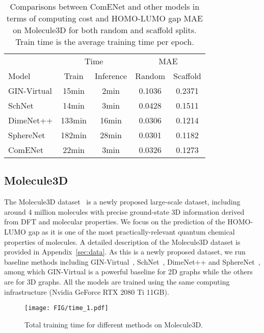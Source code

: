 \documentclass{article}
\begin{document}
\begin{wraptable}[]{r}{0.6\textwidth}
\vspace{-15 pt}
\begin{center}
\caption{Comparisons between ComENet and other models in terms of computing cost and HOMO-LUMO gap MAE on Molecule3D for both random and scaffold splits. Train time is the average training time per epoch.}
\label{tb:result_molecule3d}
\small
{\begin{tabular}{lcc|cc}\toprule
&\multicolumn{2}{c|}{Time} 
&\multicolumn{2}{c}{MAE}  \\
\cmidrule(l{4pt}r{4pt}){2-3}
\cmidrule(l{4pt}r{4pt}){4-5}
Model  &Train &Inference &Random &Scaffold \\
\midrule
GIN-Virtual &15min &2min &0.1036  &0.2371 \\
SchNet &14min &3min &0.0428 &0.1511 \\
DimeNet++ &133min &16min &0.0306 &0.1214 \\
SphereNet &182min &28min &0.0301  &0.1182 \\
ComENet &22min &3min &0.0326 &0.1273 \\
\bottomrule
\end{tabular}}
\end{center}
\vspace{- 8 pt}
\end{wraptable}

\subsection{Molecule3D} \label{sec:exp_molecule3d}

The Molecule3D dataset~\cite{xu2021molecule3d} is a newly proposed large-scale dataset, including around 4 million molecules with precise ground-state 3D information derived from DFT and molecular properties. 
We focus on the prediction of the HOMO-LUMO gap as it is one of the most practically-relevant quantum chemical properties of molecules. A detailed description of the Molecule3D dataset is provided in Appendix~\ref{sec:data}.
As this is a newly proposed dataset, we run baseline methods including GIN-Virtual~\cite{hu2021ogb}, SchNet~\cite{schutt2017schnet}, DimeNet++\cite{klicpera_dimenetpp_2020} and SphereNet~\cite{liu2022spherical},
among which GIN-Virtual is a powerful baseline for 2D graphs while the others are for 3D graphs. 
All the models are trained using the same computing infrastructure (Nvidia GeForce RTX 2080 Ti 11GB).


\begin{wrapfigure}[]{l}{.45\textwidth}
    \centering
\texttt{[image: FIG/time\_1.pdf]}
    \vspace{-15 pt}
    \caption{Total training time for different methods on Molecule3D.
    }\label{fig:time}
    \vspace{-15 pt}
\end{wrapfigure}
\end{document}
